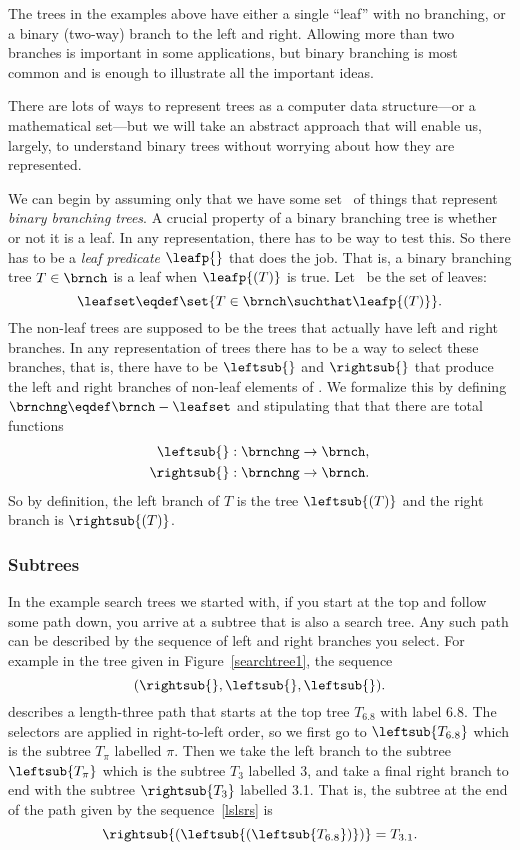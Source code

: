 \begin{definition}
The trees in the examples above have either a single ``leaf'' with no
branching, or a binary (two-way) branch to the left and right.
Allowing more than two branches is important in some applications, but
binary branching is most common and is enough to illustrate all the
important ideas.

There are lots of ways to represent trees as a computer data
structure---or a mathematical set---but we will take an abstract
approach that will enable us, largely, to understand binary trees
without worrying about how they are represented.

We can begin by assuming only that we have some set \brnch\ of things
that represent \emph{binary branching trees}.  A crucial property of a
binary branching tree is whether or not it is a leaf.  In any
representation, there has to be way to test this.  So there has to be
a \emph{leaf predicate} $\leafp{}$ that does the job.  That is, a
binary branching tree $T \in \brnch$ is a leaf when $\leafp{(T)}$ is
true.  Let \leafset\ be the set of leaves:
\[
\leafset \eqdef \set{T \in \brnch \suchthat \leafp{(T)}}.
\]
The non-leaf trees are supposed to be the trees that actually have
left and right branches.  In any representation of trees there has to
be a way to select these branches, that is, there have to be
 $\leftsub{}$ and $\rightsub{}$ that produce
the left and right branches of non-leaf elements of \brnch.  We
formalize this by defining $\brnchng \eqdef \brnch - \leafset$ and
stipulating that that there are total functions
\begin{align*}
\leftsub{}: \brnchng  & \to \brnch,\\
\rightsub{}:\brnchng  & \to \brnch.
\end{align*}
So by definition, the left branch of $T$ is the tree $\leftsub{(T)}$
and the right branch is $\rightsub{(T)}$.

\subsubsection{Subtrees}

In the example search trees we started with, if you start at the top
and follow some path down, you arrive at a subtree that is also a
search tree.  Any such path can be described by the sequence of left
and right branches you select.  For example in the tree given in
Figure~\ref{searchtree1}, the sequence
\begin{equation}\label{lslsrs}
(\rightsub{},\leftsub{},\leftsub{}).
\end{equation}
describes a length-three path that starts at the top tree $T_{6.8}$
with label 6.8.  The selectors are applied in right-to-left order, so
we first go to $\leftsub{T_{6.8}}$ which is the subtree $T_{\pi}$
  labelled $\pi$.  Then we take the left branch to the subtree
  $\leftsub{T_{\pi}}$ which is the subtree $T_3$ labelled 3, and take
  a final right branch to end with the subtree $\rightsub{T_3}$
  labelled 3.1.  That is, the subtree at the end of the path given by
  the sequence~\eqref{lslsrs} is
\[
\rightsub{(\leftsub{(\leftsub{T_{6.8}})})} = T_{3.1}.
\]


\end{definition}
